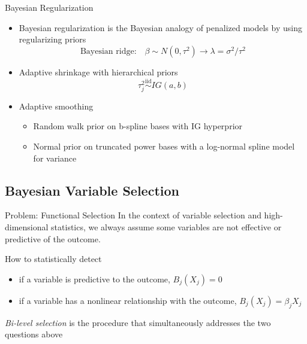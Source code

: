 \documentclass[
  ignorenonframetext,
  aspectratio=169]{beamer}
\providecommand{\tightlist}{%
  \setlength{\itemsep}{0pt}\setlength{\parskip}{0pt}}
\newcommand{\simiid}{\overset{\text{iid}}{\sim}}
\begin{document}
\begin{frame}{Bayesian Regularization}
\protect\hypertarget{bayesian-regularization-1}{}
\begin{itemize}
\tightlist
\item
  Bayesian regularization is the Bayesian analogy of penalized models by
  using regularizing priors \[
   \text{Bayesian ridge:} \quad \beta \sim N(0, \tau^2) \rightarrow  \lambda = \sigma^2/\tau^2
  \]
\item
  Adaptive shrinkage with hierarchical priors \[
   \tau^2_j \simiid IG(a, b)
  \]
\item
  Adaptive smoothing

  \begin{itemize}
  \tightlist
  \item
    Random walk prior on b-spline bases with IG hyperprior
  \item
    Normal prior on truncated power bases with a log-normal spline model
    for variance
  \end{itemize}
\end{itemize}
\end{frame}

\hypertarget{bayesian-variable-selection}{%
\subsection{Bayesian Variable
Selection}\label{bayesian-variable-selection}}

\begin{frame}{Problem: Functional Selection}
\protect\hypertarget{problem-functional-selection}{}
In the context of variable selection and high-dimensional statistics, we
always assume some variables are not effective or predictive of the
outcome.

\begin{tcolorbox}[colback=green!5,colframe=green!40!black,title=Question]
How to statistically detect
  \begin{itemize}
    \item if a variable is predictive to the outcome, $B_j(X_j) = 0$
    \item if a variable has a nonlinear relationship with the outcome, $B_j(X_j) = \beta_j X_j$
  \end{itemize}
\end{tcolorbox}

\emph{Bi-level selection} is the procedure that simultaneously addresses
the two questions above
\end{frame}
\end{document}
